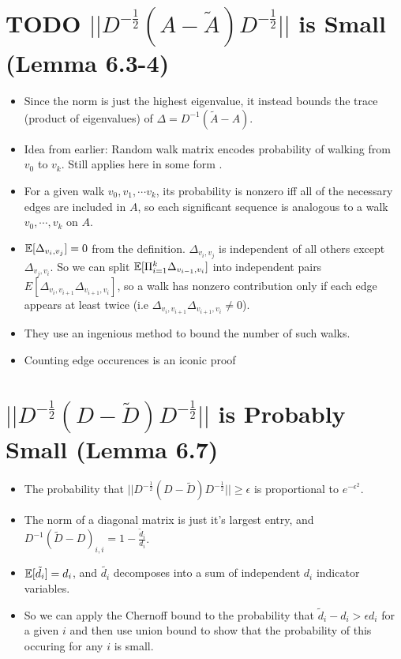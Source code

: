 \documentclass[11pt]{article}
\begin{document}
\section{{\bfseries\sffamily TODO} \(||D^{-\frac12}(A-\tilde{A}) D^{-\frac12}||\) is Small (Lemma 6.3-4)}
\label{sec:orgb4242fc}
\begin{itemize}
\item Since the norm is just the highest eigenvalue, it instead bounds the trace (product of eigenvalues) of \(\Delta= D^{-1}(\tilde{A}-A)\).
\item Idea from earlier: Random walk matrix encodes probability of walking from \(v_0\) to \(v_k\). Still applies here in some form .
\item For a given walk \(v_0,v_1,\cdots v_k\), its probability is nonzero iff all of the necessary edges are included in \(A\), so each significant sequence is analogous to a walk \(v_0, \cdots, v_k\) on \(A\).
\item \(\mathbb{E}[\Delta_{v_i,v_j}]=0\) from the definition. \(\Delta_{v_i,v_j}\) is independent of all others except \(\Delta_{v_j,v_i}\). So we can split \(\mathbb{E}[\Pi_{i=1}^k \Delta_{v_{i-1},v_i}]\) into independent pairs \(E[\Delta_{v_i,v_{i+1}}\Delta_{v_{i+1},v_i}]\), so a walk has nonzero contribution only if each edge appears at least twice (i.e \(\Delta_{v_i,v_{i+1}}\Delta_{v_{i+1},v_i} \ne 0\)).
\item They use an ingenious method to bound the number of such walks.
\item Counting edge occurences is an iconic proof
\end{itemize}
\section{\(||D^{-\frac12}(D-\tilde{D}) D^{-\frac12}||\) is Probably Small (Lemma 6.7)}
\label{sec:orgbcc7081}
\begin{itemize}
\item The probability that \(||D^{-\frac12}(D-\tilde{D})D^{-\frac12}|| \ge \epsilon\) is proportional to \(e^{-\epsilon^2}\).
\item The norm of a diagonal matrix is just it's largest entry, and \(D^{-1}(\tilde{D}-D)_{i,i}=1-\frac{\tilde{d}_i}{d_i}\).
\item \(\mathbb{E}[\tilde{d}_i]=d_i\), and \(\tilde{d_i}\) decomposes into a sum of independent \(d_i\) indicator variables.
\item So we can apply the Chernoff bound to the probability that \(\tilde{d}_i-d_i > \epsilon d_i\) for a given \(i\) and then use union bound to show that the probability of this occuring for any \(i\) is small.
\end{itemize}
\end{document}
